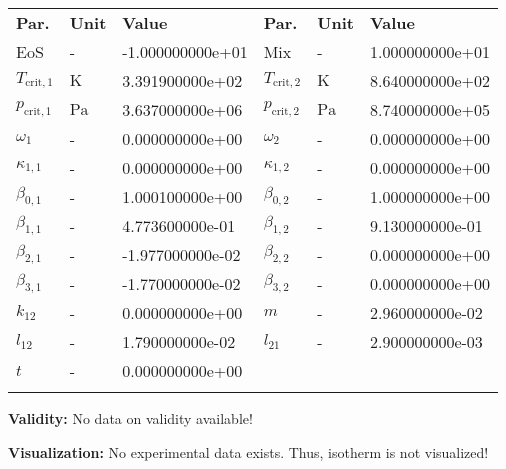 \begin{longtable}[l]{lll|lll}
\toprule
\addlinespace
\textbf{Par.} & \textbf{Unit} & \textbf{Value} &	\textbf{Par.} & \textbf{Unit} & \textbf{Value} \\
\addlinespace
\midrule
\endhead

\bottomrule
\endfoot
\bottomrule
\endlastfoot
\addlinespace

EoS & - & -1.000000000e+01 & Mix & - & 1.000000000e+01 \\
$T_\mathrm{crit,1}$ & $\si{\kelvin}$ & 3.391900000e+02 & $T_\mathrm{crit,2}$ & $\si{\kelvin}$ & 8.640000000e+02 \\
$p_\mathrm{crit,1}$ & $\si{\pascal}$ & 3.637000000e+06 & $p_\mathrm{crit,2}$ & $\si{\pascal}$ & 8.740000000e+05 \\
$\omega_{1}$ & - & 0.000000000e+00 & $\omega_{2}$ & - & 0.000000000e+00 \\
$\kappa_{1,1}$ & - & 0.000000000e+00 & $\kappa_{1,2}$ & - & 0.000000000e+00 \\
$\beta_{0,1}$ & - & 1.000100000e+00 & $\beta_{0,2}$ & - & 1.000000000e+00 \\
$\beta_{1,1}$ & - & 4.773600000e-01 & $\beta_{1,2}$ & - & 9.130000000e-01 \\
$\beta_{2,1}$ & - & -1.977000000e-02 & $\beta_{2,2}$ & - & 0.000000000e+00 \\
$\beta_{3,1}$ & - & -1.770000000e-02 & $\beta_{3,2}$ & - & 0.000000000e+00 \\
$k_{12}$ & - & 0.000000000e+00 & $m$ & - & 2.960000000e-02 \\
$l_{12}$ & - & 1.790000000e-02 & $l_{21}$ & - & 2.900000000e-03 \\
$t$ & - & 0.000000000e+00 & & & \\

\addlinespace\end{longtable}

\textbf{Validity:}
\newline
No data on validity available!
\newline

\textbf{Visualization:}
%
\newline
No experimental data exists. Thus, isotherm is not visualized!
%

\FloatBarrier
\newpage
